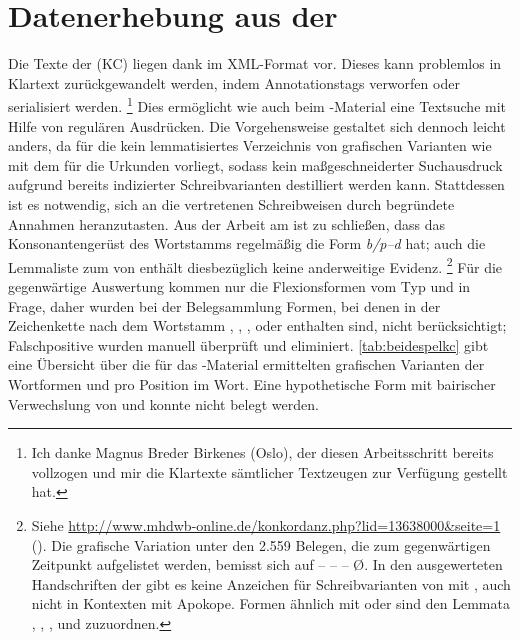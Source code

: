 
\section{Datenerhebung aus der }

Die Texte der \KC{} (KC) liegen dank 
\autocite{kcdigital} im XML-Format vor. Dieses kann problemlos in Klartext
zurückgewandelt werden, indem Annotationstags verworfen oder serialisiert
werden.%
%
	\footnote{Ich danke Magnus Breder Birkenes (Oslo), der diesen Arbeitsschritt
	bereits vollzogen und mir die Klartexte sämtlicher Textzeugen zur Verfügung
	gestellt hat.}
%
Dies ermöglicht wie auch beim \CAO{}-Material eine Textsuche mit Hilfe
von regulären Ausdrücken. Die Vorgehensweise gestaltet sich dennoch leicht
anders, da für die \KC{} kein lemmatisiertes Verzeichnis von grafischen
Varianten wie mit dem \WMU{} für die Urkunden vorliegt, sodass kein
maßgeschneiderter Suchausdruck aufgrund bereits indizierter Schreibvarianten
destilliert werden kann. Stattdessen ist es notwendig, sich an die vertretenen
Schreibweisen durch begründete Annahmen heranzutasten. Aus der Arbeit am
\CAO{} ist zu schließen, dass das Konsonantengerüst des Wortstamms
regelmäßig die Form \textit{b/p--d} hat; auch die Lemmaliste zum
 von \citeauthor{mwb1}
\autocite[\pno~]{mwb1} enthält diesbezüglich keine anderweitige
Evidenz.%
%
	\footnote{Siehe
		\url{http://www.mhdwb-online.de/konkordanz.php?lid=13638000&seite=1}
		(). Die grafische Variation unter den 2.559 Belegen,
		die zum gegenwärtigen Zeitpunkt aufgelistet werden, bemisst sich auf
		 --  --  --
		 Ø. In den
		ausgewerteten Handschriften der \KC{} gibt es keine Anzeichen für
		Schreibvarianten von  mit , auch nicht in
		Kontexten mit Apokope. Formen ähnlich  mit  oder
		 sind den Lemmata  ,
		 ,  ,
		  und  
		zuzuordnen.}
%
Für die gegenwärtige Auswertung kommen nur die Flexionsformen vom Typ 
und  in Frage, daher wurden bei der Belegsammlung Formen, bei denen
in der Zeichenkette nach dem Wortstamm , , , 
oder  enthalten sind, nicht berücksichtigt; Falschpositive wurden
manuell überprüft und eliminiert. \cref{tab:beidespelkc} gibt eine Übersicht
über die für das \KC{}-Material ermittelten grafischen Varianten der
Wortformen  und  pro Position im Wort. Eine
hypothetische Form  mit bairischer Verwechslung von  und
 \autocite[153]{paul2007} konnte nicht belegt werden.

